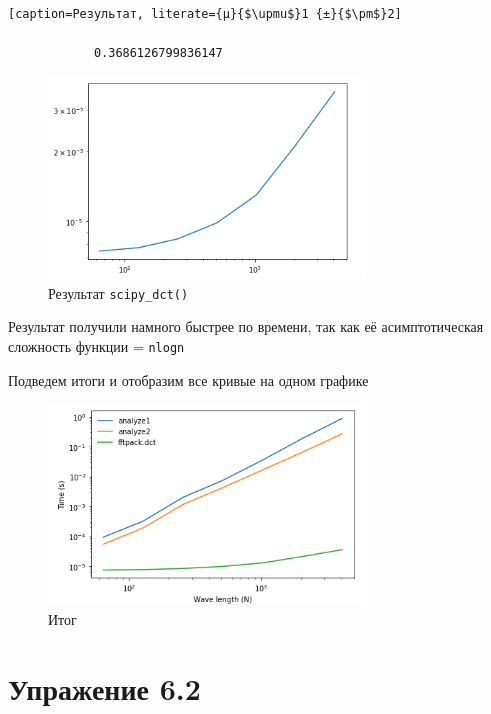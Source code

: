 \documentclass[a4paper,12pt]{article}
\begin{document}
\begin{enumerate}
\begin{lstlisting}[caption=Результат, literate={µ}{$\upmu$}1 {±}{$\pm$}2]
		
			0.3686126799836147
		\end{lstlisting}
		
		\begin{figure}[H]
			\centering
			\includegraphics[width=0.75\textwidth]{1_3.png}
			\caption{Результат \texttt{scipy\_dct()}}
			\label{fig:1.3}
		\end{figure}
		
		Результат получили намного быстрее по времени, так как её асимптотическая сложность функции = \texttt{nlogn}
		
		Подведем итоги и отобразим все кривые на одном графике
		\begin{figure}[H]
			\centering
			\includegraphics[width=0.75\textwidth]{1_4.png}
			\caption{Итог}
			\label{fig:1.4}
		\end{figure}
		
	\end{enumerate}
	\newpage
	
	
	\section {Упражение 6.2}
	
\end{document}
